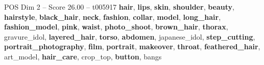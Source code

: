 \begin{textsample}{POS Dim 2 – Score 26.00 – t005917}  \label{ex:f2_pos_008}
\textbf{hair}, \textbf{lips}, \textbf{skin}, \textbf{shoulder}, \textbf{beauty}, \textbf{hairstyle}, \textbf{black\_hair}, \textbf{neck}, \textbf{fashion}, \textbf{collar}, \textbf{model}, \textbf{long\_hair}, \textbf{fashion\_model}, \textbf{pink}, \textbf{waist}, \textbf{photo\_shoot}, \textbf{brown\_hair}, \textbf{thorax}, gravure\_idol, \textbf{layered\_hair}, \textbf{torso}, \textbf{abdomen}, japanese\_idol, \textbf{step\_cutting}, \textbf{portrait\_photography}, \textbf{film}, \textbf{portrait}, \textbf{makeover}, \textbf{throat}, \textbf{feathered\_hair}, art\_model, \textbf{hair\_care}, crop\_top, \textbf{button}, bangs

\end{textsample}
